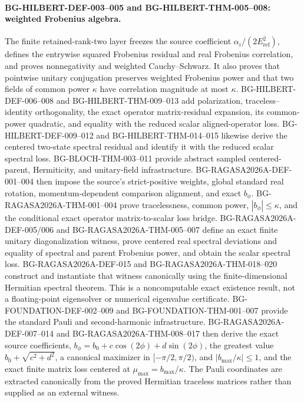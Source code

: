 \documentclass[11pt]{article}
\begin{document}
\paragraph{BG-HILBERT-DEF-003--005 and BG-HILBERT-THM-005--008: weighted Frobenius algebra.}
The finite retained-rank-two layer freezes the source coefficient
$\alpha_i/(2E_{\mathrm{ref}}^2)$, defines the entrywise squared Frobenius residual and
real Frobenius correlation, and proves nonnegativity and weighted Cauchy--Schwarz.
It also proves that pointwise unitary conjugation preserves weighted Frobenius power and
that two fields of common power $\kappa$ have correlation magnitude at most $\kappa$.
BG-HILBERT-DEF-006--008 and BG-HILBERT-THM-009--013 add polarization,
traceless--identity orthogonality, the exact operator matrix-residual expansion, its
common-power quadratic, and equality with the reduced scalar aligned-operator loss.
BG-HILBERT-DEF-009--012 and BG-HILBERT-THM-014--015 likewise derive the
centered two-state spectral residual and identify it with the reduced scalar spectral
loss. BG-BLOCH-THM-003--011 provide abstract sampled centered-parent, Hermiticity, and unitary-field
infrastructure. BG-RAGASA2026A-DEF-001--004 then impose the source's strict-positive
weights, global standard real rotation, momentum-dependent comparison alignment, and
exact $b_\phi$. BG-RAGASA2026A-THM-001--004 prove tracelessness, common power,
$|b_\phi|\le\kappa$, and the conditional exact operator matrix-to-scalar loss bridge.
BG-RAGASA2026A-DEF-005/006 and BG-RAGASA2026A-THM-005--007 define an exact finite
unitary diagonalization witness, prove centered real spectral deviations and equality of
spectral and parent Frobenius power, and obtain the scalar spectral loss.
BG-RAGASA2026A-DEF-015 and BG-RAGASA2026A-THM-018--020 construct and instantiate that
witness canonically using the finite-dimensional Hermitian spectral theorem. This is a
noncomputable exact existence result, not a floating-point eigensolver or numerical
eigenvalue certificate.
BG-FOUNDATION-DEF-002--009 and BG-FOUNDATION-THM-001--007 provide the standard Pauli
and second-harmonic infrastructure. BG-RAGASA2026A-DEF-007--014 and
BG-RAGASA2026A-THM-008--017 then derive the exact source coefficients,
$b_\phi=b_0+c\cos(2\phi)+d\sin(2\phi)$, the greatest value
$b_0+\sqrt{c^2+d^2}$, a canonical maximizer in $[-\pi/2,\pi/2)$, and
$|b_{\max}/\kappa|\le1$, and the exact finite matrix loss centered at
$\mu_{\max}=b_{\max}/\kappa$. The Pauli coordinates are extracted canonically from the
proved Hermitian traceless matrices rather than supplied as an external witness.
\end{document}
